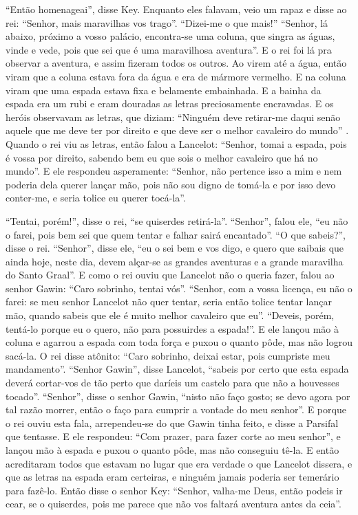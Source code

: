 “Então homenageai”, disse Key. Enquanto eles falavam, veio um rapaz e disse ao
rei: “Senhor, mais maravilhas vos trago”. “Dizei-me o que mais!” “Senhor, lá
abaixo, próximo a vosso palácio, encontra-se uma coluna, que singra as águas,
vinde e vede, pois que sei que é uma maravilhosa aventura”. E o rei foi lá pra
observar a aventura, e assim fizeram todos os outros. Ao virem até a água,
então viram que a coluna estava fora da água e era de mármore vermelho. E na
coluna viram que uma espada estava fixa e belamente embainhada. E a bainha da
espada era um rubi e eram douradas as letras preciosamente encravadas. E os
heróis observavam as letras, que diziam: “Ninguém deve retirar-me daqui senão
aquele que me deve ter por direito e que deve ser o melhor cavaleiro do mundo”
. Quando o rei viu as letras, então falou a Lancelot: “Senhor, tomai a
espada, pois é vossa por direito, sabendo bem eu que sois o melhor cavaleiro
que há no mundo”. E ele respondeu asperamente: “Senhor, não pertence isso a mim
e nem poderia dela querer lançar mão, pois não sou digno de tomá-la e por isso
devo conter-me, e seria tolice eu querer tocá-la”. 

“Tentai, porém!”, disse o rei, “se quiserdes retirá-la”. “Senhor”, falou ele,
“eu não o farei, pois bem sei que quem tentar e falhar sairá encantado”. “O que
sabeis?”, disse o rei. “Senhor”, disse ele, “eu o sei bem e vos digo, e quero
que saibais que ainda hoje, neste dia, devem alçar-se as grandes aventuras e a
grande maravilha do Santo Graal”. E como o rei ouviu que Lancelot não
o queria fazer, falou ao senhor Gawin: “Caro sobrinho, tentai vós”. “Senhor,
com a vossa licença, eu não o farei: se meu senhor Lancelot não quer tentar,
seria então tolice tentar lançar mão, quando sabeis que ele é muito melhor
cavaleiro que eu”. “Deveis, porém, tentá-lo porque eu o quero, não para
possuirdes a espada!”. E ele lançou mão à coluna e agarrou a espada com toda
força e puxou o quanto pôde, mas não logrou sacá-la. O rei disse atônito: “Caro
sobrinho, deixai estar, pois cumpriste meu mandamento”. “Senhor Gawin”, disse
Lancelot, “sabeis por certo que esta espada deverá cortar-vos de tão perto que
daríeis um castelo para que não a houvesses tocado”. “Senhor”, disse o senhor
Gawin, “nisto não faço gosto; se devo agora por tal razão morrer, então o faço
para cumprir a vontade do meu senhor”. E porque o rei ouviu esta fala,
arrependeu-se do que Gawin tinha feito, e disse a Parsifal que tentasse. E ele
respondeu: “Com prazer, para fazer corte ao meu senhor”, e lançou mão à espada
e puxou o quanto pôde, mas não conseguiu tê-la. E então acreditaram
todos que estavam no lugar que era verdade o que Lancelot dissera, e que as
letras na espada eram certeiras, e ninguém jamais poderia ser temerário para
fazê-lo. Então disse o senhor Key: “Senhor, valha-me Deus, então podeis ir
cear, se o quiserdes, pois me parece que não vos faltará aventura antes da
ceia”. 

